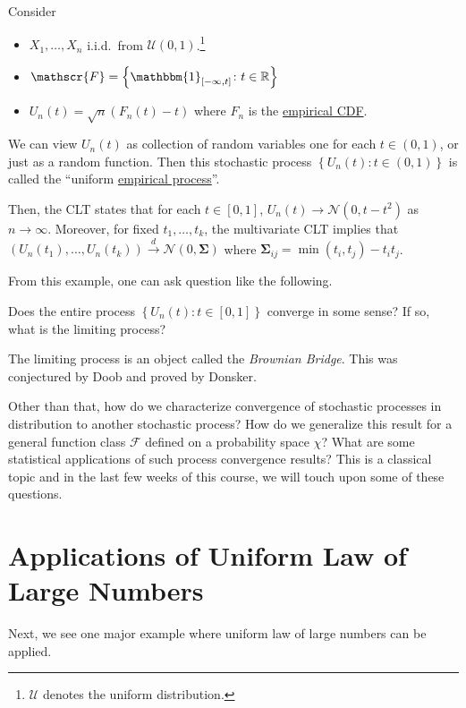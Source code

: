 \begin{eg}
	Consider
	\begin{itemize}
		\item \(X_1, \dots , X_n\) i.i.d.\ from \(\mathcal{U} (0, 1)\).\footnote{\(\mathcal{U}\) denotes the uniform distribution.}
		\item \(\mathscr{F} = \left\{ \mathbbm{1}_{[-\infty , t]} \colon t\in \mathbb{R}  \right\} \)
		\item \(U_n(t) = \sqrt{n} (F_n(t) - t) \) where \(F_n\) is the \hyperref[def:empirical-CDF]{empirical CDF}.
	\end{itemize}
	We can view \(U_n(t) \) as collection of random variables one for each \(t\in (0, 1)\), or just as a random function. Then this stochastic process \(\left\{ U_n(t)\colon t\in (0, 1) \right\} \) is called the ``uniform \hyperref[def:empirical-process]{empirical process}''.

	Then, the CLT states that for each \(t\in [0, 1]\), \(U_n(t) \to \mathcal{N} (0, t - t^2)\) as \(n \to \infty \). Moreover, for fixed \(t_1, \dots , t_k\), the multivariate CLT implies that \((U_n(t_1), \dots , U_n(t_k)) \overset{d}{\to } \mathcal{N} (0, \mathbf{\Sigma} ) \) where \(\mathbf{\Sigma} _{ij} = \min (t_i, t_j) - t_i t_j\).
\end{eg}

From this example, one can ask question like the following.

\begin{problem*}
	Does the entire process \(\left\{ U_n(t)\colon t\in [0, 1] \right\} \) converge in some sense? If so, what is the limiting process?
\end{problem*}
\begin{answer}
	The limiting process is an object called the \emph{Brownian Bridge}. This was conjectured by Doob and proved by Donsker.
\end{answer}

Other than that, how do we characterize convergence of stochastic processes in distribution to another stochastic process? How do we generalize this result for a general function class \(\mathscr{F} \) defined on a probability space \(\chi \)? What are some statistical applications of such process convergence results? This is a classical topic and in the last few weeks of this course, we will touch upon some of these questions.

\section{Applications of Uniform Law of Large Numbers}
Next, we see one major example where uniform law of large numbers can be applied.


